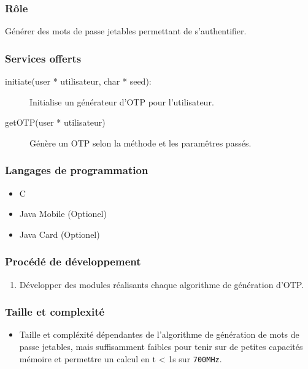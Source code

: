 \documentclass{"../../res/univ-projet"}
\begin{document}
    \subsubsection{Rôle}
        Générer des mots de passe jetables permettant de s'authentifier.

    \subsubsection{Services offerts}
    \begin{description}
        \item[initiate(user * utilisateur, char * seed):] Initialise
            un générateur d'OTP pour l'utilisateur.
        \item[getOTP(user * utilisateur)] Génère un OTP selon la méthode et les
            paramêtres passés.
    \end{description}

    \subsubsection{Langages de programmation}
    \begin{itemize}
        \item C
        \item Java Mobile (Optionel)
        \item Java Card (Optionel)
    \end{itemize}

    \subsubsection{Procédé de développement}
    \begin{enumerate}
        \item Développer des modules réalisants chaque algorithme de génération
            d'OTP.
    \end{enumerate}

    \subsubsection{Taille et complexité}
    \begin{itemize}
        \item Taille et compléxité dépendantes de l'algorithme de génération
            de mots de passe jetables, mais suffisamment faibles pour tenir sur
            de petites capacités mémoire et permettre un calcul 
            en t < 1s sur \verb?700MHz?.
    \end{itemize}
\end{document}
